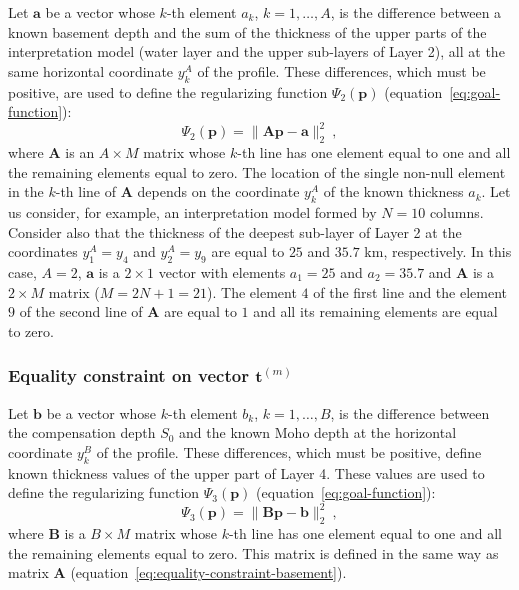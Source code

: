 \documentclass[manuscript,revised]{geophysics}
\begin{document}
Let $\mathbf{a}$ be a vector whose $k$-th element $a_{k}$,
$k = 1, \dots, A$, is the difference between a known basement depth and
the sum of the thickness of the upper parts of the interpretation model
(water layer and the upper sub-layers of Layer 2), all at the same
horizontal coordinate $y^{A}_{k}$ of the profile. 
These differences, which must be positive, are used to define 
the regularizing function $\Psi_{2}(\mathbf{p})$ 
(equation~\ref{eq:goal-function}):
\begin{equation}
\Psi_{2}(\mathbf{p}) = \| \mathbf{A}\mathbf{p} - \mathbf{a} \|_{2}^{2} \: ,
\label{eq:equality-constraint-basement}
\end{equation}
where $\mathbf{A}$ is an $A \times M$ matrix whose $k$-th line has one element 
equal to one and all the remaining elements equal to zero. The location of the
single non-null element in the $k$-th line of $\mathbf{A}$ depends on the coordinate
$y^{A}_{k}$ of the known thickness $a_{k}$. Let us consider, 
for example, an interpretation model formed by $N = 10$ columns. Consider also that 
the thickness of the deepest sub-layer of Layer 2  
at the coordinates $y^{A}_{1} = y_{4}$ and $y^{A}_{2} = y_{9}$ 
are equal to $25$ and $35.7$ km, respectively. In this case, $A = 2$,
$\mathbf{a}$ is a $2 \times 1$ vector with elements $a_{1} = 25$ and $a_{2} = 35.7$
and $\mathbf{A}$ is a $2 \times M$ matrix ($M = 2N + 1 = 21$). The element $4$ of the
first line and the element $9$ of the second line of $\mathbf{A}$ are equal to $1$ and
all its remaining elements are equal to zero.

\subsubsection*{Equality constraint on vector $\mathbf{t}^{(m)}$}

Let $\mathbf{b}$ be a vector whose $k$-th element $b_{k}$,
$k = 1, \dots, B$, is the difference between the compensation depth
$S_{0}$ and the known Moho depth at the horizontal coordinate $y^{B}_{k}$ of the
profile. These differences, which must be positive, define known thickness values
of the upper part of Layer 4. These values are used to define the 
regularizing function $\Psi_{3}(\mathbf{p})$ (equation~\ref{eq:goal-function}):
\begin{equation}
\Psi_{3}(\mathbf{p}) = \| \mathbf{B}\mathbf{p} - \mathbf{b} \|_{2}^{2} \: ,
\label{eq:equality-constraint-moho}
\end{equation}
where $\mathbf{B}$ is a $B \times M$ matrix whose $k$-th line has one element 
equal to one and all the remaining elements equal to zero. This matrix is defined 
in the same way as matrix $\mathbf{A}$ (equation~\ref{eq:equality-constraint-basement}).
\end{document}

